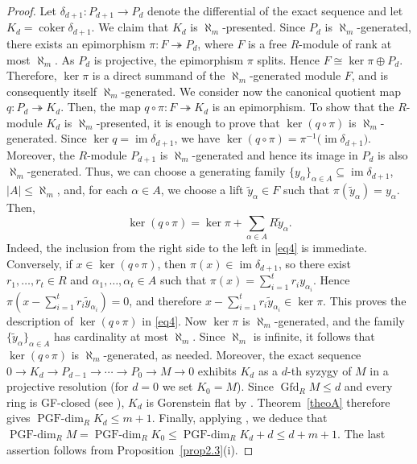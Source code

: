 \documentclass[12pt]{amsart}
\theoremstyle{remark}
\theoremstyle{definition}
\theoremstyle{plain}
\DeclareMathOperator{\Gfd}{Gfd}
\DeclareMathOperator{\im}{im}
\DeclareMathOperator{\coker}{coker}
\newcommand{\PGFdim}{\operatorname{PGF\text{-}dim}}
\begin{document}
\begin{proof}Let $\delta_{d+1}:P_{d+1}\rightarrow P_d$ denote the differential of the exact sequence and let $K_d=\coker\delta_{d+1}$.
We claim that $K_d$ is $\aleph_m$-presented. Since $P_d$ is $\aleph_m$-generated, there exists an epimorphism $\pi:F\twoheadrightarrow P_d$, where $F$ is a free $R$-module of rank at most $\aleph_m$.
As $P_d$ is projective, the epimorphism $\pi$ splits. Hence $F\cong \ker\pi\oplus P_d$. Therefore, $\ker\pi$ is a direct summand of the
$\aleph_m$-generated module $F$, and is consequently itself $\aleph_m$-generated. We consider now the canonical quotient map $q:P_d\twoheadrightarrow K_d$. Then, the map $q\circ\pi:F\twoheadrightarrow K_d$ is an epimorphism. To show that the $R$-module $K_d$ is $\aleph_m$-presented, it is enough to prove that $\ker(q\circ\pi)$ is $\aleph_m$-generated. Since $\ker q=\im\delta_{d+1}$,
we have $\ker(q\circ\pi)=\pi^{-1}\!\bigl(\im\delta_{d+1}\bigr)$. Moreover, the $R$-module $P_{d+1}$ is $\aleph_m$-generated and hence its image in $P_d$
is also $\aleph_m$-generated. Thus, we can choose a generating family $\{y_\alpha\}_{\alpha\in A}
\subseteq \im\delta_{d+1}$, $|A|\leq\aleph_m$,
and, for each $\alpha\in A$, we choose a lift $\widetilde y_\alpha\in F$ such that $\pi(\widetilde y_\alpha)=y_\alpha.$ Then,
\begin{equation}\label{eq4}
	\ker(q\circ\pi)=\ker\pi+\sum_{\alpha\in A}R\widetilde y_\alpha.\end{equation}
Indeed, the inclusion from the right side to the left in \eqref{eq4} is immediate. Conversely, if $x\in\ker(q\circ\pi)$, then $\pi(x)\in\im\delta_{d+1}$, so there exist $r_1,\dots,r_t\in R$ and $\alpha_1,\dots,\alpha_t\in A$ such that $\pi(x)=\sum_{i=1}^t r_i y_{\alpha_i}$. Hence
$\pi\left(x-\sum_{i=1}^t r_i\widetilde y_{\alpha_i}\right)=0$,
and therefore
$x-\sum_{i=1}^t r_i\widetilde y_{\alpha_i}\in\ker\pi$.
This proves the description of $\ker(q\circ\pi)$ in \eqref{eq4}.
Now $\ker\pi$ is $\aleph_m$-generated, and the family
$\{\widetilde y_\alpha\}_{\alpha\in A}$ has cardinality at most
$\aleph_m$. Since $\aleph_m$ is infinite,
it follows that $\ker(q\circ\pi)$ is $\aleph_m$-generated, as needed.
 Moreover, the exact sequence $0\to K_d\to P_{d-1}\to\cdots\to P_0\to M\to0$ exhibits $K_d$ as a $d$-th syzygy of $M$ in a projective resolution (for $d=0$ we set $K_0=M$). Since $\Gfd_RM\le d$ and every ring is GF-closed (see \cite[Corollary~4.12]{SS}), $K_d$ is Gorenstein flat by \cite[Theorem~2.8]{Ben}. Theorem~\ref{theoA} therefore gives $\PGFdim_RK_d\le m+1$. Finally, applying \cite[Lemma~1.2]{St0}, we deduce that $\PGFdim_RM=\PGFdim_RK_0\le\PGFdim_RK_d+d\le d+m+1$. The last assertion follows from Proposition~\ref{prop2.3}(i).
\end{proof}
\end{document}
